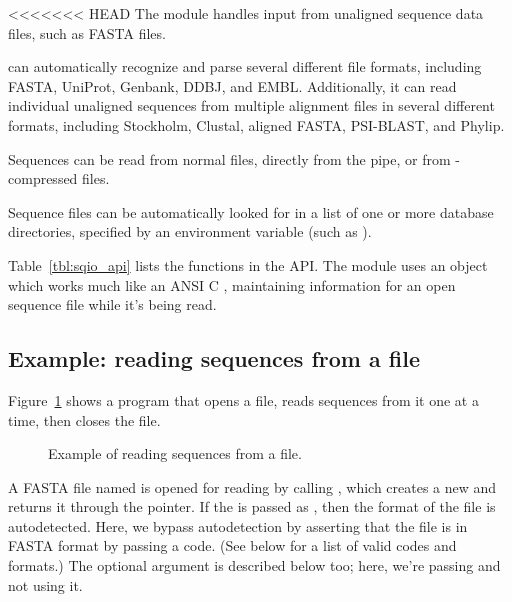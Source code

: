 <<<<<<< HEAD
The  module handles input from unaligned sequence data
files, such as FASTA files.

 can automatically recognize and parse several different
file formats, including FASTA, UniProt, Genbank, DDBJ, and EMBL.
Additionally, it can read individual unaligned sequences from multiple
alignment files in several different formats, including Stockholm,
Clustal, aligned FASTA, PSI-BLAST, and Phylip.

Sequences can be read from normal files, directly from the
 pipe, or from -compressed files.

Sequence files can be automatically looked for in a list of one or
more database directories, specified by an environment variable (such
as ).

Table~\ref{tbl:sqio_api} lists the functions in the  API.
The module uses an  object which works much like an
ANSI C , maintaining information for an open sequence file
while it's being read.

%




\subsection{Example: reading sequences from a file}

Figure~\ref{fig:sqio_example_text} shows a program that opens a file, reads
sequences from it one at a time, then closes the file.

\begin{figure}

\caption{Example of reading sequences from a file.}
\label{fig:sqio_example_text}
\end{figure}

A FASTA file named  is opened for reading by calling
, which
creates a new  and returns it through the
 pointer. If the  is passed as
, then the format of the file is
autodetected. Here, we bypass autodetection by asserting that the file
is in FASTA format by passing a  code. (See
below for a list of valid codes and formats.) The optional 
argument is described below too; here, we're passing  and
not using it.

